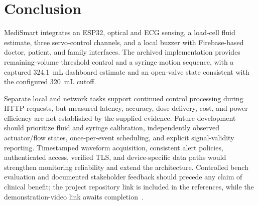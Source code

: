 \section{Conclusion}\label{sec:conclusion}
MediSmart integrates an ESP32, optical and ECG sensing, a load-cell fluid estimate, three servo-control channels, and a local buzzer with Firebase-based doctor, patient, and family interfaces. The archived implementation provides remaining-volume threshold control and a syringe motion sequence, with a captured 324.1~mL dashboard estimate and an open-valve state consistent with the configured 320~mL cutoff.

Separate local and network tasks support continued control processing during HTTP requests, but measured latency, accuracy, dose delivery, cost, and power efficiency are not established by the supplied evidence. Future development should prioritize fluid and syringe calibration, independently observed actuator/flow states, once-per-event scheduling, and explicit signal-validity reporting. Timestamped waveform acquisition, consistent alert policies, authenticated access, verified TLS, and device-specific data paths would strengthen monitoring reliability and extend the architecture. Controlled bench evaluation and documented stakeholder feedback should precede any claim of clinical benefit; the project repository link is included in the references, while the demonstration-video link awaits completion~\cite{projectgithub,projectyoutube}.
